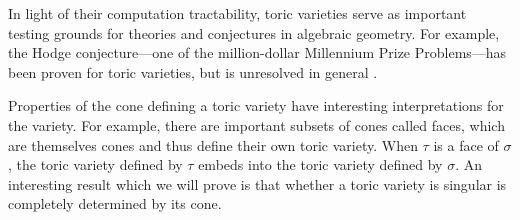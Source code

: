 \documentclass[12pt]{amsart}
\theoremstyle{plain}
\begin{document}
In light of their computation tractability, toric varieties serve as important testing grounds for theories and conjectures in algebraic geometry.
For example, the Hodge conjecture---one of the million-dollar Millennium Prize Problems---has been proven for toric varieties, but is unresolved in general \cite{BM21}.

Properties of the cone defining a toric variety have interesting interpretations for the variety.
For example, there are important subsets of cones called faces, which are themselves cones and thus define their own toric variety.
When $\tau$ is a face of $\sigma$, the toric variety defined by $\tau$ embeds into the toric variety defined by $\sigma$.
An interesting result which we will prove is that whether a toric variety is singular is completely determined by its cone.
\end{document}
